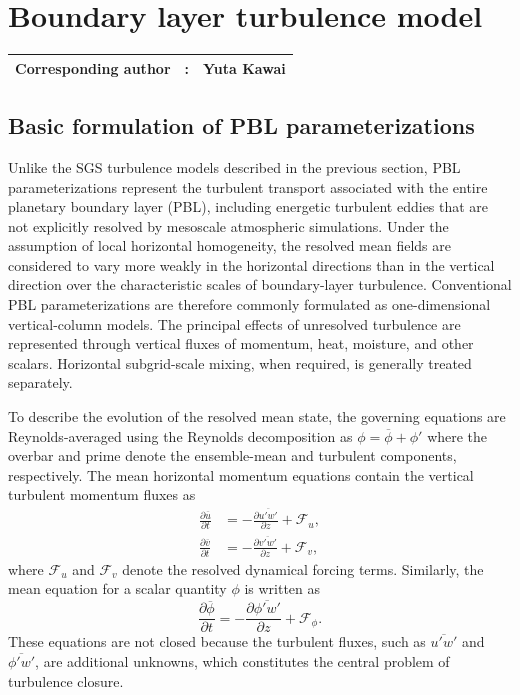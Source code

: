 
\section{Boundary layer turbulence model}
{\bf \Large
\begin{tabular}{ccc}
\hline
  Corresponding author & : & Yuta Kawai\\
\hline
\end{tabular}
}

\subsection{Basic formulation of PBL parameterizations}
Unlike the SGS turbulence models described in the previous section, 
PBL parameterizations represent the turbulent transport associated with the entire planetary boundary layer (PBL), 
including energetic turbulent eddies that are not explicitly resolved by mesoscale atmospheric simulations.
Under the assumption of local horizontal homogeneity, the resolved mean fields are considered to vary more weakly in the horizontal directions than in the vertical direction over the characteristic scales of boundary-layer turbulence.
Conventional PBL parameterizations are therefore commonly formulated as one-dimensional vertical-column models.
The principal effects of unresolved turbulence are represented through vertical fluxes of momentum, heat, moisture, and other scalars.
Horizontal subgrid-scale mixing, when required, is generally treated separately.


To describe the evolution of the resolved mean state, 
the governing equations are Reynolds-averaged using the Reynolds decomposition as
$\phi = \overline{\phi} + \phi'$
where the overbar and prime denote the ensemble-mean and turbulent components, respectively.
The mean horizontal momentum equations contain the vertical turbulent momentum fluxes as
%
\begin{align}
 \frac{\partial \overline{u}}{\partial t} &= -\frac{\partial \overline{u'w'}}{\partial z} + \mathcal{F}_u, \\
 \frac{\partial \overline{v}}{\partial t} &= -\frac{\partial \overline{v'w'}}{\partial z} + \mathcal{F}_v,
\end{align}
%
where $\mathcal{F}_u$ and $\mathcal{F}_v$ denote the resolved dynamical forcing terms.
Similarly, the mean equation for a scalar quantity $\phi$ is written as
%
\begin{equation}
 \frac{\partial \overline{\phi}}{\partial t} = -\frac{\partial \overline{\phi'w'}}{\partial z} + \mathcal{F}_{\phi}.
\end{equation}
These equations are not closed because the turbulent fluxes, such as $\overline{u'w'}$ and $\overline{\phi'w'}$, are additional unknowns,
which constitutes the central problem of turbulence closure.

